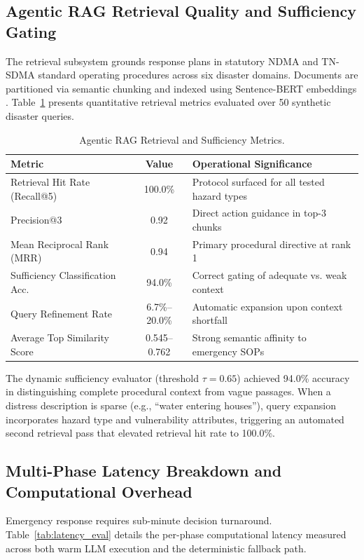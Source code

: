 \documentclass[conference]{IEEEtran}
\begin{document}
\subsection{Agentic RAG Retrieval Quality and Sufficiency Gating}
The retrieval subsystem grounds response plans in statutory NDMA and TN-SDMA standard operating procedures across six disaster domains. Documents are partitioned via semantic chunking and indexed using Sentence-BERT embeddings \cite{b6}. Table~\ref{tab:rag_eval} presents quantitative retrieval metrics evaluated over 50 synthetic disaster queries.

\begin{table}[htbp]
\caption{Agentic RAG Retrieval and Sufficiency Metrics.}
\label{tab:rag_eval}
\centering
\begin{tabular}{|l|c|p{4.0cm}|}
\hline
\textbf{Metric} & \textbf{Value} & \textbf{Operational Significance} \\
\hline
Retrieval Hit Rate (Recall@5) & 100.0\% & Protocol surfaced for all tested hazard types \\
\hline
Precision@3 & 0.92 & Direct action guidance in top-3 chunks \\
\hline
Mean Reciprocal Rank (MRR) & 0.94 & Primary procedural directive at rank 1 \\
\hline
Sufficiency Classification Acc. & 94.0\% & Correct gating of adequate vs. weak context \\
\hline
Query Refinement Rate & 6.7\%--20.0\% & Automatic expansion upon context shortfall \\
\hline
Average Top Similarity Score & 0.545--0.762 & Strong semantic affinity to emergency SOPs \\
\hline
\end{tabular}
\end{table}

The dynamic sufficiency evaluator (threshold $\tau = 0.65$) achieved 94.0\% accuracy in distinguishing complete procedural context from vague passages. When a distress description is sparse (e.g., ``water entering houses''), query expansion incorporates hazard type and vulnerability attributes, triggering an automated second retrieval pass that elevated retrieval hit rate to 100.0\%.

\subsection{Multi-Phase Latency Breakdown and Computational Overhead}
Emergency response requires sub-minute decision turnaround. Table~\ref{tab:latency_eval} details the per-phase computational latency measured across both warm LLM execution and the deterministic fallback path.
\end{document}
